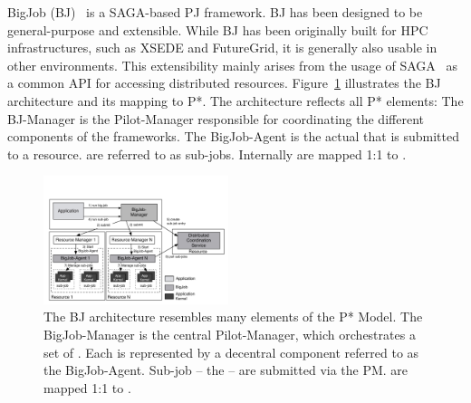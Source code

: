 \documentclass[conference]{IEEEtran}
\begin{document}

BigJob (BJ)~\cite{bigjob_web,saga_bigjob_condor_cloud} is a SAGA-based PJ
framework. BJ has been designed to be general-purpose and extensible. While BJ
has been originally built for HPC infrastructures, such as XSEDE and
FutureGrid, it is generally also usable in other environments. This
extensibility mainly arises from the usage of SAGA~\cite{saga_url,ogf-gfd-90} 
as a common API for accessing distributed resources. 
Figure~\ref{fig:figures_re_bigjob_interactions} illustrates the
BJ architecture and its mapping to P*. The architecture reflects
all P* elements: The BJ-Manager is the Pilot-Manager responsible for
coordinating the different components of the frameworks. The
BigJob-Agent is the actual \pilot that is submitted to a
resource. \cus are referred to as sub-jobs. Internally \cus are mapped
1:1 to \sus.


\begin{figure}[t]
	\up\upp
	\centering
	\includegraphics[width=0.48\textwidth]{../figures/re_bigjob_interactions.pdf}
	\caption{ The
          BJ architecture resembles many elements of the P* Model. The
          BigJob-Manager is the central Pilot-Manager, which
          orchestrates a set of \pilots. Each \pilot is represented by a
          decentral component referred to as the BigJob-Agent. Sub-job
          -- the \cus -- are submitted via the PM. \cus are mapped 1:1
          to \sus.\upp\upp}
	\label{fig:figures_re_bigjob_interactions}
\end{figure}
\end{document}
